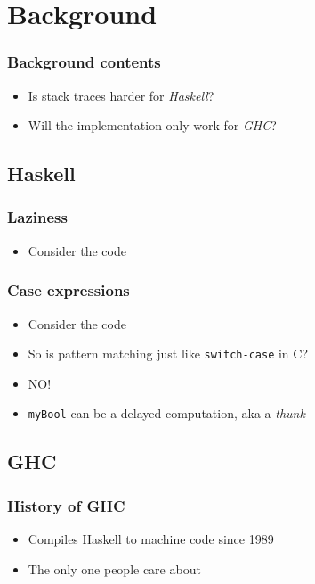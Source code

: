 \documentclass[11pt]{beamer} %
\begin{document}
\section{Background}

  \begin{frame}
   \frametitle{Background contents}
  \begin{itemize}
   \item Is stack traces harder for \emph{Haskell}?
   \item Will the implementation only work for \emph{GHC}?
  \end{itemize}
  \end{frame}


\subsection{Haskell}

  \begin{frame}
   \frametitle{Laziness}
  \begin{itemize}
   \item Consider the code
     \lazyCode
  \end{itemize}
  \end{frame}

  \begin{frame}
   \frametitle{Case expressions}
  \begin{itemize}
   \item <1-> Consider the code
     \caseCode
   \item <1-> So is pattern matching just like \texttt{switch-case} in C?
   \item <2-> NO!
   \item <3-> \texttt{myBool} can be a delayed computation, aka a \emph{thunk}
  \end{itemize}
  \end{frame}

\subsection{GHC}
  \begin{frame}
   \frametitle{History of GHC}
  \begin{itemize}
   \item Compiles Haskell to machine code since 1989
   \item The only one people care about
  \end{itemize}
  \end{frame}
\end{document}
